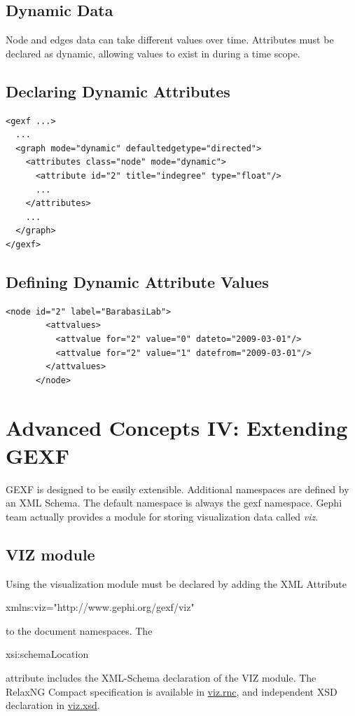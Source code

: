 \documentclass[a4paper,10pt]{article}
\begin{document}
\subsection{Dynamic Data}

Node and edges data can take different values over time. Attributes must be declared as dynamic, allowing values to exist in during a time scope.

\subsection{Declaring Dynamic Attributes}

\lstset{ style=gexf }
\begin{lstlisting}[caption={Indegree may change over time!}]
<gexf ...>
  ...
  <graph mode="dynamic" defaultedgetype="directed">
    <attributes class="node" mode="dynamic">
      <attribute id="2" title="indegree" type="float"/>
      ...
    </attributes>
    ...
  </graph>
</gexf>
\end{lstlisting}

\subsection{Defining Dynamic Attribute Values}

\lstset{ style=gexf }
\begin{lstlisting}[caption={Indegree changes over time!}]
<node id="2" label="BarabasiLab">
        <attvalues>
          <attvalue for="2" value="0" dateto="2009-03-01"/>
          <attvalue for="2" value="1" datefrom="2009-03-01"/>
        </attvalues>
      </node>
\end{lstlisting}

\section{Advanced Concepts IV: Extending GEXF} \label{extendgexf}

GEXF is designed to be easily extensible. Additional namespaces are defined by an XML Schema. The default namespace is always the gexf namespace. Gephi team actually provides a module for storing visualization data called \textit{viz}.

\subsection{VIZ module} \label{viz}

Using the visualization module must be declared by adding the XML Attribute \begin{footnotesize}xmlns:viz="http://www.gephi.org/gexf/viz"\end{footnotesize} to the document namespaces. The \begin{footnotesize}xsi:schemaLocation\end{footnotesize} attribute includes the XML-Schema declaration of the VIZ module. The RelaxNG Compact specification is available in \href{http://gephi.org/gexf/1.1draft/viz.rnc}{viz.rnc}, and independent XSD declaration in \href{http://gephi.org/gexf/1.1draft/viz.xsd}{viz.xsd}.
\end{document}
